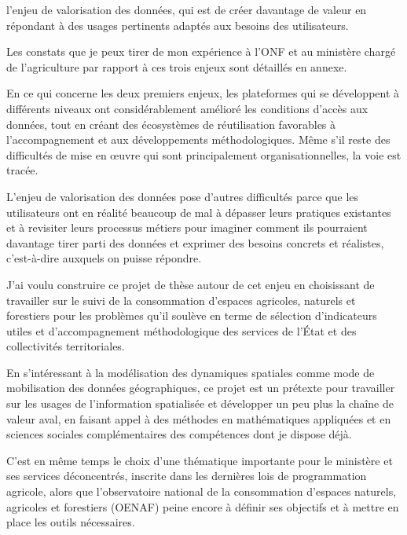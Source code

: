 \item l'enjeu de valorisation des données, qui est de créer davantage de valeur en
répondant à des usages pertinents adaptés aux besoins des utilisateurs.

\stopitemize

Les constats que je peux tirer de mon expérience à l'ONF et au ministère
chargé de l'agriculture par rapport à ces trois enjeux sont détaillés en
annexe.

En ce qui concerne les deux premiers enjeux, les plateformes qui se
développent à différents niveaux ont considérablement amélioré les conditions
d'accès aux données, tout en créant des écosystèmes de réutilisation
favorables à l'accompagnement et aux développements méthodologiques. Même s'il
reste des difficultés de mise en œuvre qui sont principalement
organisationnelles, la voie est tracée.

L'enjeu de valorisation des données pose d'autres difficultés parce que les
utilisateurs ont en réalité beaucoup de mal à dépasser leurs pratiques
existantes et à revisiter leurs processus métiers pour imaginer comment ils
pourraient davantage tirer parti des données
et exprimer des besoins concrets et réalistes,
c'est-à-dire auxquels on puisse répondre.

J'ai voulu construire ce projet de thèse autour de cet enjeu en choisissant de
travailler sur le suivi de la consommation d'espaces agricoles,
naturels et forestiers pour les problèmes qu'il soulève en terme
de sélection d'indicateurs utiles et d'accompagnement méthodologique des services de l'État
et des collectivités territoriales.

En s'intéressant à la modélisation des dynamiques spatiales comme mode de
mobilisation des données géographiques, ce projet est un prétexte pour
travailler sur les usages de l'information spatialisée et développer un peu
plus la chaîne de valeur aval, en faisant appel à des méthodes en
mathématiques appliquées et en sciences sociales complémentaires des
compétences dont je dispose déjà.

C'est en même temps le choix d'une thématique importante pour le ministère et
ses services déconcentrés, inscrite dans les dernières lois de programmation
agricole, alors que l'observatoire national de la consommation d'espaces
naturels, agricoles et forestiers (OENAF) peine encore à définir ses
objectifs et à mettre en place les outils nécessaires.